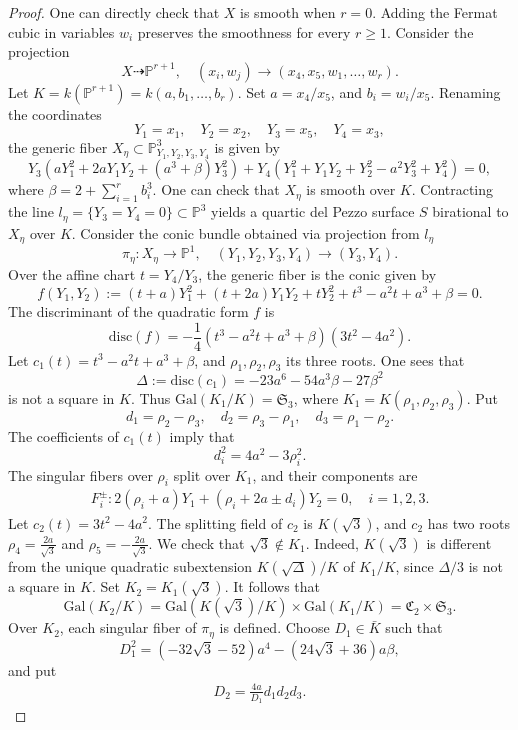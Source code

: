 \documentclass[10pt,a4paper]{amsart}
\def\Gal{\mathrm{Gal}}
\def\bP{{\mathbb P}}
\def\disc{{\mathrm{disc}}}
\def\fC{{\mathfrak C}}
\def\fS{{\mathfrak S}}
\begin{document}
\begin{proof}
  One can directly check that
$X$ is smooth when $r=0$. Adding the Fermat cubic in variables $w_i$ preserves the smoothness for every $r\geq 1$. Consider the projection 
    $$
    X\dashrightarrow \bP^{r+1},\quad (x_i,w_j)\to (x_4,x_5,w_1,\ldots,w_r).
    $$
    Let $K=k(\bP^{r+1})=k(a,b_1,\ldots,b_r)$. Set $a=x_4/x_5$, and $b_i=w_i/x_5$. Renaming the coordinates 
    $$
    Y_1=x_1,\quad Y_2=x_2, \quad Y_3=x_5,\quad Y_4=x_3,
    $$
 the generic fiber $X_\eta\subset\bP^3_{Y_1,Y_2,Y_3,Y_4}$ is given by
$$
Y_3(aY_1^2+2aY_1Y_2+(a^3+\beta)Y_3^2)+Y_4(Y_1^2+Y_1Y_2+Y_2^2-a^2Y_3^2+Y_4^2)=0,
$$
where $\beta=2+\sum_{i=1}^rb_i^3$. One can check that $X_\eta$ is smooth over $K$. Contracting the line $l_\eta=\{Y_3=Y_4=0\}\subset\bP^3$ yields a quartic del Pezzo surface $S$ birational to $X_\eta$ over $K$. Consider the  conic bundle obtained via projection from $l_\eta$
$$
\pi_\eta:X_\eta\to\bP^1,\quad (Y_1,Y_2,Y_3,Y_4)\to (Y_3,Y_4).
$$
Over the affine chart $t=Y_4/Y_3$, the generic fiber is the conic given by 
$$
f(Y_1,Y_2):=(t + a)Y_1^2 + (t + 2a)Y_1Y_2 + tY_2^2 + t^3 -a^2t + a^3 + \beta=0.
$$
The discriminant of the quadratic form $f$ is 
$$
\mathrm{disc}(f)=-\frac14(t^3-a^2t+a^3+\beta)(3t^2-4a^2).
$$
Let $c_1(t)=t^3-a^2t+a^3+\beta$, and $\rho_1,\rho_2,\rho_3$ its three roots. One sees that
$$
\Delta:=\disc(c_1)=-23a^6 - 54a^3\beta - 27\beta^2
$$
is not a square in $K$. Thus $\Gal(K_1/K)=\fS_3$, where $K_1=K(\rho_1,\rho_2,\rho_3)$. Put 
$$
d_1=\rho_2-\rho_3,\quad d_2=\rho_3-\rho_1,\quad d_3=\rho_1-\rho_2.
$$
The coefficients of $c_1(t)$ imply that 
$$
d_i^2=4a^2-3\rho_i^2.
$$
The singular fibers over $\rho_i$ split over $K_1$, and their components are
\begin{align}\label{eqn:I3fiber1}
F_i^\pm:    2(\rho_i+a)Y_1+(\rho_i+2a\pm d_i)Y_2=0,\quad i=1,2,3.
\end{align}
Let $c_2(t)=3t^2-4a^2$. The splitting field of $c_2$ is $K(\sqrt{3})$, and $c_2$ has two roots 
$\rho_4=\frac{2a}{\sqrt3}$ and $\rho_5=-\frac{2a}{\sqrt3}$. We check that $\sqrt{3}\notin K_1$. Indeed, $K(\sqrt 3)$ is different from the unique quadratic subextension $K(\sqrt{\Delta})/K$ of $K_1/K$, since ${\Delta/3}$ is  not a square in $K$. Set $K_2=K_1(\sqrt 3)$. It follows that
$$
\Gal(K_2/K)=\Gal(K(\sqrt 3)/K)\times \Gal(K_1/K)=\fC_2\times\fS_3.
$$
Over $K_2$, each singular fiber of $\pi_\eta$ is defined. Choose $D_1\in\bar K$ such that 
$$
D_1^2=(-32\sqrt3-52)a^4-(24\sqrt3+36)a\beta,
$$
and put 
\begin{align}
    \label{eqn:I3D2}
D_2=\frac{4a}{D_1}d_1d_2d_3.

\end{align}
\end{proof}
\end{document}

